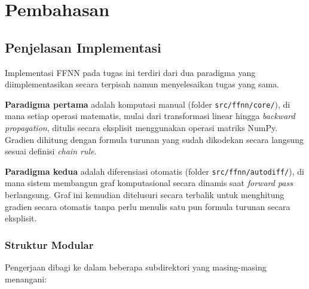 
\chapter{Pembahasan}

\section{Penjelasan Implementasi}

Implementasi FFNN pada tugas ini terdiri dari dua paradigma yang diimplementasikan secara terpisah namun menyelesaikan tugas yang sama.

\textbf{Paradigma pertama} adalah komputasi manual (folder \texttt{src/ffnn/core/}), di mana setiap operasi matematis, mulai dari transformasi linear hingga \textit{backward propagation}, ditulis secara eksplisit menggunakan operasi matriks NumPy. Gradien dihitung dengan formula turunan yang sudah dikodekan secara langsung sesuai definisi \textit{chain rule}.

\textbf{Paradigma kedua} adalah diferensiasi otomatis (folder \texttt{src/ffnn/autodiff/}), di mana sistem membangun graf komputasional secara dinamis saat \textit{forward pass} berlangsung. Graf ini kemudian ditelusuri secara terbalik untuk menghitung gradien secara otomatis tanpa perlu menulis satu pun formula turunan secara eksplisit.

\subsection{Struktur Modular}

Pengerjaan dibagi ke dalam beberapa subdirektori yang masing-masing menangani:

